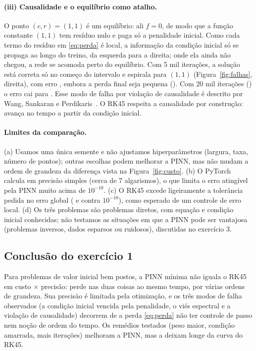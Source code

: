 \paragraph{(iii) Causalidade e o equilíbrio como atalho.} O ponto $(c, r) = (1, 1)$ é um equilíbrio: ali $f = 0$, de modo
que a função constante $(1,1)$ tem resíduo nulo e paga só a penalidade inicial. Como cada termo do resíduo em
\eqref{eq:perda} é local, a informação da condição inicial só se propaga ao longo do treino, da esquerda para a direita;
onde ela ainda não chegou, a rede se acomoda perto do equilíbrio. Com 5 mil iterações, a solução está correta só no
começo do intervalo e espirala para $(1,1)$ (Figura~\ref{fig:falhas}, direita), com erro \ErroPINNCoelhos, embora a
perda final seja pequena (\MultaPINNCoelhos). Com 20 mil iterações (\TempoPINNCoelhosLongo) o erro cai para
\ErroPINNCoelhosLongo. Esse modo de falha por violação de causalidade é descrito por Wang, Sankaran e
Perdikaris~\cite{wang2024causality}. O RK45 respeita a causalidade por construção: avança no tempo a partir da condição
inicial.

\paragraph{Limites da comparação.} (a) Usamos uma única semente e não ajustamos hiperparâmetros (largura, taxa,
número de pontos); outras escolhas podem melhorar a PINN, mas não mudam a ordem de grandeza da diferença vista na
Figura~\ref{fig:custo}. (b) O PyTorch calcula em precisão simples (cerca de 7 algarismos), o que limita o erro
atingível pela PINN muito acima de $10^{-10}$. (c) O RK45 excede ligeiramente a tolerância pedida no erro global
(\ErroRKOscilante{} e \ErroRKCoelhos{} contra $10^{-10}$), como esperado de um controle de erro local. (d) Os três
problemas são problemas diretos, com equação e condição inicial conhecidas; não testamos as situações em que a PINN
pode ser vantajosa (problemas inversos, dados esparsos ou ruidosos), discutidas no exercício 3.

\subsection{Conclusão do exercício 1}

Para problemas de valor inicial bem postos, a PINN mínima não iguala o RK45 em custo $\times$ precisão: perde nas duas
coisas ao mesmo tempo, por várias ordens de grandeza. Sua precisão é limitada pela otimização, e os três modos de
falha observados (a condição inicial vencida pela penalidade, o viés espectral e a violação de causalidade) decorrem de
a perda \eqref{eq:perda} não ter controle de passo nem noção de ordem do tempo. Os remédios testados (peso maior,
condição amarrada, mais iterações) melhoram a PINN, mas a deixam longe da curva do RK45.
